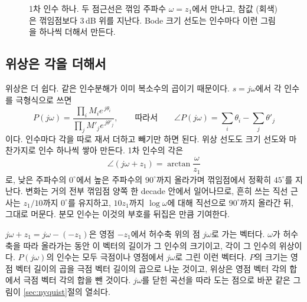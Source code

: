 \documentclass[11pt]{article}
\begin{document}
\begin{figure}[htb]
\centering
{}
\caption{1차 인수 하나. 두 점근선은 꺾임 주파수 $\omega=z_1$에서 만나고, 참값
(회색)은 꺾임점보다 $3$\,dB 위를 지난다. Bode 크기 선도는 인수마다 이런 그림을
하나씩 더해서 만든다.}
\label{fig:bode}
\end{figure}

\subsection{위상은 각을 더해서}\label{sec:phase}
위상은 더 쉽다. 같은 인수분해가 이미 복소수의 곱이기 때문이다. $s=j\omega$에서
각 인수를 극형식으로 쓰면
\[
   P(j\omega)
   = \frac{\prod_i M_i e^{\,j\theta_i}}{\prod_j M'_j e^{\,j\theta'_j}} ,
   \qquad\text{따라서}\qquad
   \angle P(j\omega) = \sum_i \theta_i - \sum_j \theta'_j
\]
이다. 인수마다 각을 따로 재서 더하고 빼기만 하면 된다. 위상 선도도 크기 선도와
마찬가지로 인수 하나씩 쌓아 만든다. 1차 인수의 각은
\[
   \angle(j\omega+z_1) = \arctan\frac{\omega}{z_1}
\]
로, 낮은 주파수의 $0^\circ$에서 높은 주파수의 $90^\circ$까지 올라가며 꺾임점에서
정확히 $45^\circ$를 지난다. 변화는 거의 전부 꺾임점 양쪽 한 decade 안에서
일어나므로, 흔히 쓰는 직선 근사는 $z_1/10$까지 $0^\circ$를 유지하고, $10z_1$까지
$\log\omega$에 대해 직선으로 $90^\circ$까지 올라간 뒤, 그대로 머문다. 분모
인수는 이것의 부호를 뒤집은 만큼 기여한다.

\begin{remark}[기하학적으로 읽기]\label{rem:vectors}
$j\omega+z_1 = j\omega-(-z_1)$은 영점 $-z_1$에서 허수축 위의 점 $j\omega$로 가는
벡터다. $\omega$가 허수축을 따라 올라가는 동안 이 벡터의 길이가 그 인수의
크기이고, 각이 그 인수의 위상이다. $P(j\omega)$의 인수는 모두 극점이나 영점에서
$j\omega$로 그린 이런 벡터다. $P$의 크기는 영점 벡터 길이의 곱을 극점 벡터
길이의 곱으로 나눈 것이고, 위상은 영점 벡터 각의 합에서 극점 벡터 각의 합을 뺀
것이다. $j\omega$를 닫힌 곡선을 따라 도는 점으로 바꾼 같은 그림이
\ref{sec:nyquist}절의 열쇠다.
\end{remark}
\end{document}

